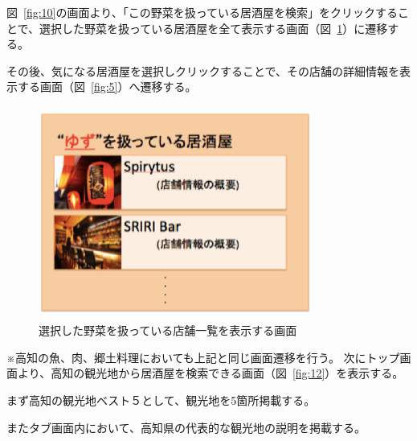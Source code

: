 \documentclass[a4j,titlepage]{jarticle}
\begin{document}
図~\ref{fig:10}の画面より、「この野菜を扱っている居酒屋を検索」をクリックすることで、選択した野菜を扱っている居酒屋を全て表示する画面（図~\ref{fig:11}）に遷移する。



その後、気になる居酒屋を選択しクリックすることで、その店舗の詳細情報を表示する画面（図~\ref{fig:5}）へ遷移する。
\clearpage
\begin {figure}[!htbp]
    \begin{center}
    \includegraphics [height=7cm, width=9cm]{11.eps}
    \caption {選択した野菜を扱っている店舗一覧を表示する画面}
    \label {fig:11}
    \end{center}
\end {figure}

※高知の魚、肉、郷土料理においても上記と同じ画面遷移を行う。
次にトップ画面より、高知の観光地から居酒屋を検索できる画面（図~\ref{fig:12}）を表示する。



まず高知の観光地ベスト５として、観光地を5箇所掲載する。



またタブ画面内において、高知県の代表的な観光地の説明を掲載する。
\end{document}
